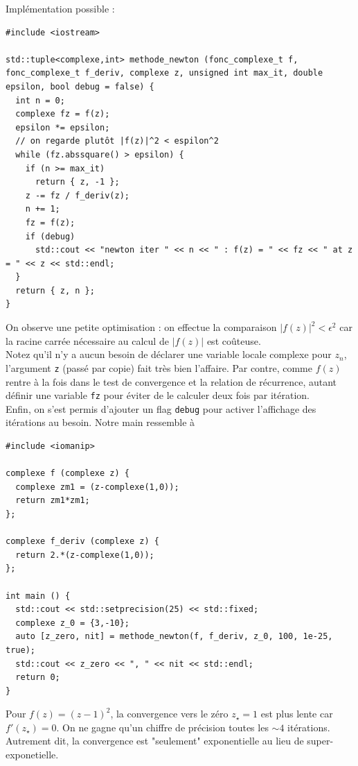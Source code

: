 \documentclass{book}
\newcommand{\inline}[1]{\texttt{#1}}
\begin{document}
\begin{correction}
Implémentation possible :

\begin{verbatim}
#include <iostream>

std::tuple<complexe,int> methode_newton (fonc_complexe_t f, fonc_complexe_t f_deriv, complexe z, unsigned int max_it, double epsilon, bool debug = false) {
  int n = 0;
  complexe fz = f(z);
  epsilon *= epsilon;
  // on regarde plutôt |f(z)|^2 < espilon^2
  while (fz.abssquare() > epsilon) {
    if (n >= max_it)
      return { z, -1 };
    z -= fz / f_deriv(z);
    n += 1;
    fz = f(z);
    if (debug)
      std::cout << "newton iter " << n << " : f(z) = " << fz << " at z = " << z << std::endl;
  }
  return { z, n };
}
\end{verbatim}

On observe une petite optimisation : on effectue la comparaison $|f(z)|^2 < \epsilon^2$ car la racine carrée nécessaire au calcul de $|f(z)|$ est coûteuse.\\

Notez qu'il n'y a aucun besoin de déclarer une variable locale complexe pour $z_n$, l'argument \inline{z} (passé par copie) fait très bien l'affaire. Par contre, comme $f(z)$ rentre à la fois dans le test de convergence et la relation de récurrence, autant définir une variable \inline{fz} pour éviter de le calculer deux fois par itération.\\

Enfin, on s'est permis d'ajouter un flag \inline{debug} pour activer l'affichage des itérations au besoin. Notre main ressemble à

\begin{verbatim}
#include <iomanip>

complexe f (complexe z) {
  complexe zm1 = (z-complexe(1,0));
  return zm1*zm1;
};

complexe f_deriv (complexe z) {
  return 2.*(z-complexe(1,0));
};

int main () {
  std::cout << std::setprecision(25) << std::fixed;
  complexe z_0 = {3,-10};
  auto [z_zero, nit] = methode_newton(f, f_deriv, z_0, 100, 1e-25, true);
  std::cout << z_zero << ", " << nit << std::endl;
  return 0;
}
\end{verbatim}

Pour $f(z)=(z-1)^2$, la convergence vers le zéro $z_\star=1$ est plus lente car $f'(z_\star) = 0$. On ne gagne qu'un chiffre de précision toutes les $\sim 4$ itérations. Autrement dit, la convergence est "seulement" exponentielle au lieu de super-exponetielle.
\end{correction}
\end{document}
